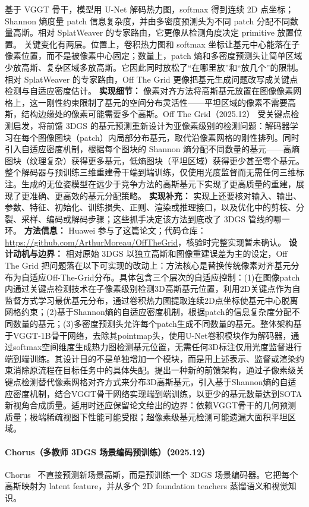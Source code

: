 基于 VGGT 骨干，模型用 U-Net 解码热力图，softmax 得到连续 2D 点坐标；Shannon 熵度量 patch 信息复杂度，并由多密度预测头为不同 patch 分配不同数量高斯。相对 SplatWeaver 的专家路由，它更像从检测角度决定 primitive 放置位置。
关键变化有两层。位置上，卷积热力图和 softmax 坐标让基元中心能落在子像素位置，而不是被像素中心固定；数量上，patch 熵和多密度预测头让简单区域少放高斯、复杂区域多放高斯。它因此同时放松了“在哪里放”和“放几个”的限制。相对 SplatWeaver 的专家路由，Off The Grid 更像把基元生成问题改写成关键点检测与自适应密度估计。
\textbf{实现细节：} 像素对齐方法将高斯基元放置在图像像素网格上，这一刚性约束限制了基元的空间分布灵活性——平坦区域的像素不需要高斯，结构边缘处的像素可能需要多个高斯。Off The Grid（2025.12） 受关键点检测启发，将前馈 3DGS 的基元预测重新设计为亚像素级别的检测问题：解码器学习在每个图像图块（patch）内局部分布基元，取代沿像素网格的刚性排列。同时引入自适应密度机制，根据每个图块的 Shannon 熵分配不同数量的基元——高熵图块（纹理复杂）获得更多基元，低熵图块（平坦区域）获得更少甚至零个基元。整个解码器与预训练三维重建骨干端到端训练，仅使用光度监督而无需任何三维标注。生成的无位姿模型在远少于竞争方法的高斯基元下实现了更高质量的重建，展现了更准确、更高效的基元分配策略。
\textbf{实现补充：} 实现上还要核对输入、输出、参数、特征、初始化、训练损失、正则、渲染或推理接口，以及优化中的剪枝、分裂、采样、编码或解码步骤；这些抓手决定该方法到底改了 3DGS 管线的哪一环。
\textbf{方法信息：} Huawei 参与了这篇论文；代码仓库：\url{https://github.com/ArthurMoreau/OffTheGrid}，核验时完整实现暂未确认。
\textbf{设计动机与边界：} 相对原始 3DGS 以独立高斯和图像重建误差为主的设定，Off The Grid 把问题落在以下可实现的改动上：方法核心是替换传统像素对齐基元分布为自适应Off-The-Grid分布。具体包含三个层次的自适应控制：(1)在图像patch内通过关键点检测技术在子像素级别检测3D高斯基元位置，利用2D关键点作为自监督方式学习最优基元分布，通过卷积热力图提取连续2D点坐标使基元中心脱离网格约束；(2)基于Shannon熵的自适应密度机制，根据patch的信息复杂度分配不同数量的基元；(3)多密度预测头允许每个patch生成不同数量的基元。整体架构基于VGGT-1B骨干网络，去除其pointmap头，使用U-Net卷积模块作为解码器，通过softmax空间维度生成热力图检测基元位置，无需任何3D标注仅用光度监督进行端到端训练。其设计目的不是单独增加一个模块，而是用上述表示、监督或渲染约束消除原流程在目标任务中的具体失配。提出一种新的前馈架构，通过子像素级关键点检测替代像素网格对齐方式来分布3D高斯基元，引入基于Shannon熵的自适应密度机制，结合VGGT骨干网络实现端到端训练，以更少的基元数量达到SOTA新视角合成质量。适用时还应保留论文给出的边界：依赖VGGT骨干的几何预测质量；极端稀疏视图下性能可能受限；超像素级基元检测可能遗漏大面积平坦区域。
\paragraph{Chorus（多教师 3DGS 场景编码预训练）（2025.12）}
Chorus~\cite{2512_17817} 不直接预测新场景高斯，而是预训练一个 3DGS 场景编码器。它把每个高斯映射为 latent feature，并从多个 2D foundation teachers 蒸馏语义和视觉知识。

